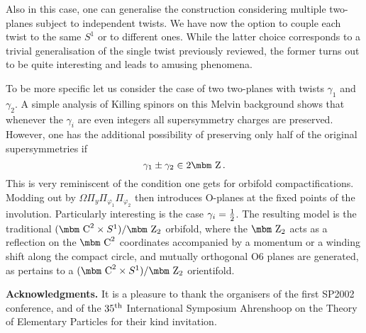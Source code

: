 \documentclass[a4paper,12pt]{article}
\def\bb#1{\hbox{\mbm #1}}
\begin{document}
Also in this case, one can generalise the construction considering multiple
two-planes subject to independent twists. We have now the option to couple
each twist to the same $S^1$ or to different ones. While the latter choice
corresponds to a trivial generalisation of the single twist previously 
reviewed, the former turns out to be quite interesting and leads to amusing
phenomena. 

To be more specific let us consider the case of two 
two-planes with twists $\gamma_1$ and $\gamma_2$. A simple analysis of Killing
spinors on this Melvin background\cite{russo2} 
shows that whenever the $\gamma_i$ are even 
integers all supersymmetry charges are preserved. However, one has the 
additional possibility of preserving only half of the original 
supersymmetries if
\begin{equation}
\gamma_1 \pm \gamma_2 \in 2 \bb{Z} \,.
\end{equation}
This is very reminiscent of the condition one gets for orbifold 
compactifications. Modding out by $\Omega \Pi_y \Pi_{\varphi_1} \Pi
_{\varphi_2}$ then introduces O-planes at the fixed points of the 
involution. Particularly interesting is the case $\gamma_i = 
{1\over 2}$. The resulting model is the traditional $(\bb{C}^2 \times S^1
) /\bb{Z}_2$ orbifold, where the $\bb{Z}_2$ acts as a reflection on the
$\bb{C}^2$ coordinates accompanied by a momentum or a winding shift along
the compact circle, and mutually orthogonal O6 planes are 
generated\cite{adm}, as
pertains to a $(\bb{C}^2 \times S^1) /\bb{Z}_2$ orientifold.

\vskip 24pt

\noindent
{\bf Acknowledgments.} It is a pleasure to thank the organisers 
of the first SP2002 conference, and of the
$35^{\rm th}$ International Symposium Ahrenshoop on the  
Theory of Elementary Particles for their kind invitation.
\end{document}
